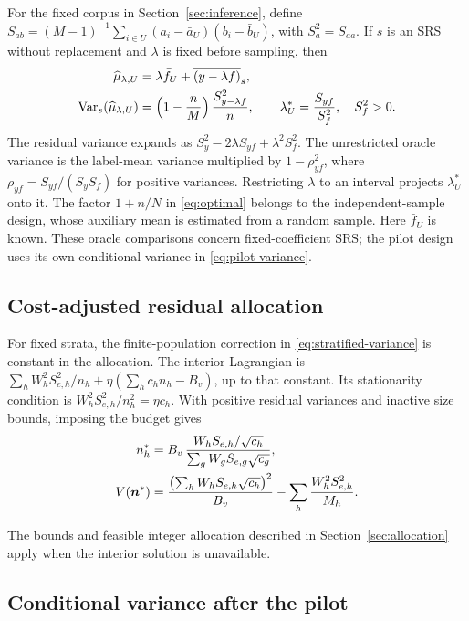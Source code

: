 \documentclass[11pt,a4paper]{article}
\newcommand{\Var}{\operatorname{Var}}
\begin{document}
For the fixed corpus in Section~\ref{sec:inference}, define
$S_{ab}=(M-1)^{-1}\sum_{i\in U}(a_i-\bar a_U)(b_i-\bar b_U)$,
with $S_a^2=S_{aa}$. If $s$ is an SRS without replacement and $\lambda$ is fixed before sampling, then
\begin{align}
 \widehat\mu_{\lambda,U}&=\lambda\bar f_U+\overline{(y-\lambda f)}_s,\notag\\
 \Var_s(\widehat\mu_{\lambda,U})
 &=\left(1-\frac nM\right)\frac{S_{y-\lambda f}^2}{n},\qquad
 \lambda_U^*=\frac{S_{yf}}{S_f^2},\quad S_f^2>0.
 \label{eq:finite-weight}
\end{align}
The residual variance expands as $S_y^2-2\lambda S_{yf}+\lambda^2S_f^2$. The unrestricted oracle variance is the label-mean variance multiplied by $1-\rho_{yf}^2$, where $\rho_{yf}=S_{yf}/(S_yS_f)$ for positive variances. Restricting $\lambda$ to an interval projects $\lambda_U^*$ onto it. The factor $1+n/N$ in \eqref{eq:optimal} belongs to the independent-sample design, whose auxiliary mean is estimated from a random sample. Here $\bar f_U$ is known. These oracle comparisons concern fixed-coefficient SRS; the pilot design uses its own conditional variance in \eqref{eq:pilot-variance}.

\subsection{Cost-adjusted residual allocation}

For fixed strata, the finite-population correction in \eqref{eq:stratified-variance} is constant in the allocation. The interior Lagrangian is $\sum_h W_h^2S_{e,h}^2/n_h+\eta(\sum_h c_hn_h-B_v)$, up to that constant. Its stationarity condition is $W_h^2S_{e,h}^2/n_h^2=\eta c_h$.
With positive residual variances and inactive size bounds, imposing the budget gives
\begin{align}
 n_h^*&=B_v\,
 \frac{W_h S_{e,h}/\sqrt{c_h}}
      {\sum_g W_g S_{e,g}\sqrt{c_g}},\notag\\
 V(\boldsymbol n^*)&=
 \frac{\bigl(\sum_h W_h S_{e,h}\sqrt{c_h}\bigr)^2}{B_v}
       -\sum_h\frac{W_h^2S_{e,h}^{2}}{M_h}.
 \label{eq:allocation-optimum}
\end{align}

The bounds and feasible integer allocation described in Section~\ref{sec:allocation} apply when the interior solution is unavailable.

\subsection{Conditional variance after the pilot}
\end{document}
